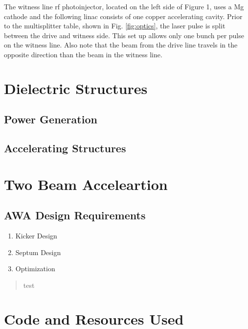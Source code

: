 \documentclass{iitthesis}
\begin{document}
The witness line rf photoinjector, located on the left side of Figure
1, uses a Mg cathode and the following linac consists of one copper
accelerating cavity. Prior to the multisplitter table, shown in
Fig. \ref{fig:optics}, the laser pulse is split between the drive and witness side.
This set up allows only one bunch per pulse on the witness line. Also
note that the beam from the drive line travels in the opposite direction
than the beam in the witness line. 

\section{Dielectric Structures}

\subsection{Power Generation}

\subsection{Accelerating Structures}

\section{Two Beam Acceleartion}

\subsection{AWA Design Requirements}

\begin{enumerate}
	\item Kicker Design
	\item Septum Design
	\item Optimization 
\end{enumerate}

\begin{quotation}
	test
\end{quotation}

\clearpage


\section{Code and Resources Used}
\end{document}
